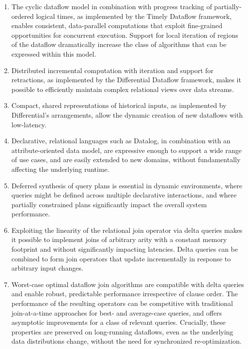 \documentclass{article}
\begin{document}
\begin{enumerate}
\item
  The cyclic dataflow model in combination with progress tracking of
  partially-ordered logical times, as implemented by the Timely
  Dataflow framework, enables consistent, data-parallel computations
  that exploit fine-grained opportunities for concurrent
  execution. Support for local iteration of regions of the dataflow
  dramatically increase the class of algorithms that can be expressed
  within this model.

\item
  Distributed incremental computation with iteration and support for
  retractions, as implemented by the Differential Dataflow framework,
  makes it possible to efficiently maintain complex relational views
  over data streams.

\item
  Compact, shared representations of historical inputs, as implemented
  by Differential's arrangements, allow the dynamic creation of new
  dataflows with low-latency.

\item
  Declarative, relational languages such as Datalog, in combination
  with an attribute-oriented data model, are expressive enough to
  support a wide range of use cases, and are easily extended to new
  domains, without fundamentally affecting the underlying runtime.

\item
  Deferred synthesis of query plans is essential in dynamic
  environments, where queries might be defined across multiple
  declarative interactions, and where partially constrained plans
  significantly impact the overall system performance.

\item
  Exploiting the linearity of the relational join operator via delta
  queries makes it possible to implement joins of arbitrary arity with
  a constant memory footprint and without significantly impacting
  latencies. Delta queries can be combined to form join operators that
  update incrementally in response to arbitrary input changes.

\item
  Worst-case optimal dataflow join algorithms are compatible with
  delta queries and enable robust, predictable performance
  irrespective of clause order. The performance of the resulting
  operators can be competitive with traditional join-at-a-time
  approaches for best- and average-case queries, and offers asymptotic
  improvements for a class of relevant queries. Crucially, these
  properties are preserved on long-running dataflows, even as the
  underlying data distributions change, without the need for
  synchronized re-optimization.


\end{enumerate}
\end{document}
